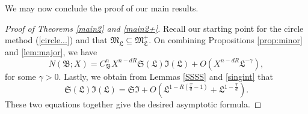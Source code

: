 \documentclass[reqno, 12pt, reqno]{amsart}
\numberwithin{equation}{section}
\renewcommand{\=}{\equiv}
\begin{document}
We may now conclude the proof of our main results.
\begin{proof}[Proof of Theorems \ref{main2} and \ref{main2+}]
Recall our starting point for the circle method (\ref{circle...}) and that $\mathfrak{M}_\mathfrak{L} \subseteq \mathfrak{M}_\mathfrak{L}^+$.
On combining Propositions \ref{prop:minor} and \ref{lem:major}, we have
\[
N(\mathfrak{B};X)
=
C_\mathfrak{B}^n  X^{n - d R} \mathfrak{S}( \mathfrak L) \mathfrak{I}(\mathfrak L) + O( X^{n  - d R} \mathfrak{L}^{- \gamma}),
\] for some $\gamma > 0$.
Lastly, we obtain from Lemmas \ref{SSSS} and \ref{singint} that
$$
\mathfrak{S} (\mathfrak{L}) \mathfrak{I} (\mathfrak{L})  =  \mathfrak{S}  \mathfrak{I}  +  O \left(  \mathfrak{L}^{ 1 - R (\frac{T}{d} - 1) } + \mathfrak{L}^{1 - \frac{T}{d} } \right).
$$
These two equations together give the desired asymptotic formula.
\end{proof}
\end{document}
